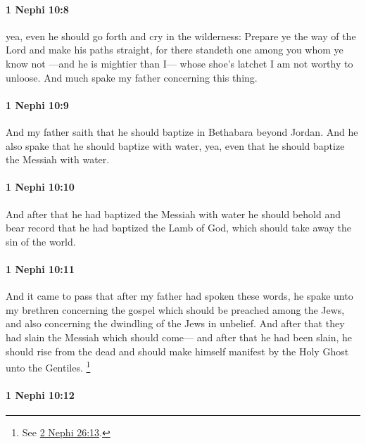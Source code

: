 		\paragraph{1 Nephi 10:8} %
			\label{1NEPHI-10-8}

			yea, even he should go forth and cry in the wilderness:
			Prepare ye the way of the Lord and make his paths straight,
			for there standeth one among you whom ye know not
			---and he is mightier than I---
			whose shoe’s latchet I am not worthy to unloose.
			And much spake my father concerning this thing.

		\paragraph{1 Nephi 10:9} %
			\label{1NEPHI-10-9}

			And my father saith that he should baptize in Bethabara beyond Jordan.
			And he also spake that he should baptize with water,
			yea, even that he should baptize the Messiah with water.

		\paragraph{1 Nephi 10:10} %
			\label{1NEPHI-10-10}

			And after that he had baptized the Messiah with water
			he should behold and bear record that he had baptized the Lamb of God,
			which should take away the sin of the world.

		\paragraph{1 Nephi 10:11} %
			\label{1NEPHI-10-11}

			And it came to pass that after my father had spoken these words,
			he spake unto my brethren concerning the gospel
			which should be preached among the Jews,
			and also concerning the dwindling of the Jews in unbelief.
			And after that they had slain the Messiah which should come---
			and after that he had been slain,
			he should rise from the dead
			and should make himself manifest by the Holy Ghost unto the Gentiles.%
				\footnote{%
					See \hyperref[2NEPHI-26-13]{2 Nephi 26:13}.
					}

		\paragraph{1 Nephi 10:12} %
			\label{1NEPHI-10-12}

